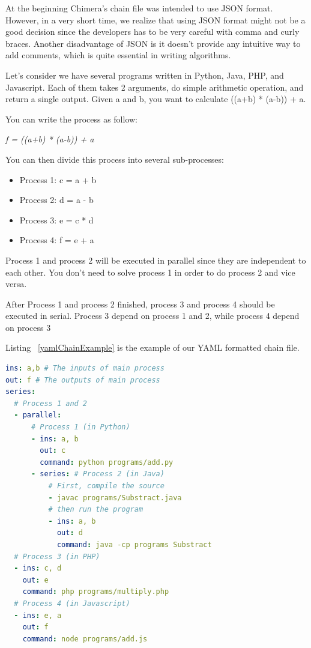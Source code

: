 \documentclass[conference]{IEEEtran}
\begin{document}
At the beginning Chimera's chain file was intended to use JSON format. However, in
a very short time, we realize that using JSON format might not be a good decision since
the developers has to be very careful with comma and curly braces. Another disadvantage
of JSON is it doesn't provide any intuitive way to add comments, which is quite
essential in writing algorithms.

Let's consider we have several programs written in Python, Java, PHP, and Javascript. 
Each of them takes 2 arguments, do simple arithmetic operation, and return a single output. 
Given a and b, you want to calculate ((a+b) * (a-b)) + a.

You can write the process as follow:

{\it f = ((a+b) * (a-b)) + a}

You can then divide this process into several sub-processes:

\begin{itemize}
    \item Process 1: c = a + b
    \item Process 2: d = a - b
    \item Process 3: e = c * d
    \item Process 4: f = e + a
\end{itemize}

Process 1 and process 2 will be executed in parallel since they are independent to each other. 
You don't need to solve process 1 in order to do process 2 and vice versa.

After Process 1 and process 2 finished, process 3 and process 4 should be executed in serial. 
Process 3 depend on process 1 and 2, while process 4 depend on process 3

Listing ~\ref{yamlChainExample} is the example of our YAML formatted chain file.

\begin{lstlisting}[caption=YAML Chain Example, label=yamlChainExample, language=yaml, basicstyle=\small, breaklines=true]
ins: a,b # The inputs of main process 
out: f # The outputs of main process 
series:
  # Process 1 and 2 
  - parallel:
      # Process 1 (in Python) 
      - ins: a, b
        out: c
        command: python programs/add.py
      - series: # Process 2 (in Java) 
          # First, compile the source  
          - javac programs/Substract.java
          # then run the program 
          - ins: a, b
            out: d
            command: java -cp programs Substract
  # Process 3 (in PHP) 
  - ins: c, d
    out: e
    command: php programs/multiply.php
  # Process 4 (in Javascript) 
  - ins: e, a
    out: f
    command: node programs/add.js
\end{lstlisting}
\end{document}
